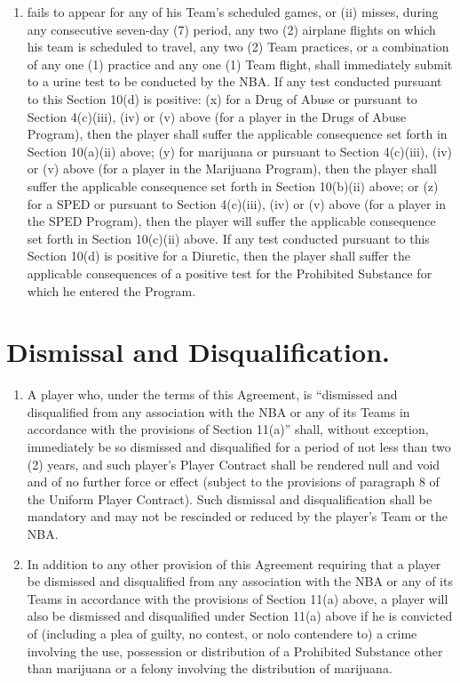 \documentclass[
]{book}
\providecommand{\tightlist}{%
  \setlength{\itemsep}{0pt}\setlength{\parskip}{0pt}}
\begin{document}
\begin{enumerate}
  \begin{enumerate}
  \def\labelenumii{(\roman{enumii})}
  \tightlist
  \item
    fails to appear for any of his Team's scheduled games, or (ii) misses, during any consecutive seven-day (7) period, any two (2) airplane flights on which his team is scheduled to travel, any two (2) Team practices, or a combination of any one (1) practice and any one (1) Team flight, shall immediately submit to a urine test to be conducted by the NBA. If any test conducted pursuant to this Section 10(d) is positive: (x) for a Drug of Abuse or pursuant to Section 4(c)(iii), (iv) or (v) above (for a player in the Drugs of Abuse Program), then the player shall suffer the applicable consequence set forth in Section 10(a)(ii) above; (y) for marijuana or pursuant to Section 4(c)(iii), (iv) or (v) above (for a player in the Marijuana Program), then the player shall suffer the applicable consequence set forth in Section 10(b)(ii) above; or (z) for a SPED or pursuant to Section 4(c)(iii), (iv) or (v) above (for a player in the SPED Program), then the player will suffer the applicable consequence set forth in Section 10(c)(ii) above. If any test conducted pursuant to this Section 10(d) is positive for a Diuretic, then the player shall suffer the applicable consequences of a positive test for the Prohibited Substance for which he entered the Program.
  \end{enumerate}
\end{enumerate}

\hypertarget{dismissal-and-disqualification.}{%
\section{Dismissal and Disqualification.}\label{dismissal-and-disqualification.}}

\begin{enumerate}
\def\labelenumi{(\alph{enumi})}
\tightlist
\item
  A player who, under the terms of this Agreement, is ``dismissed and disqualified from any association with the NBA or any of its Teams in accordance with the provisions of Section 11(a)'' shall, without exception, immediately be so dismissed and disqualified for a period of not less than two (2) years, and such player's Player Contract shall be rendered null and void and of no further force or effect (subject to the provisions of paragraph 8 of the Uniform Player Contract). Such dismissal and disqualification shall be mandatory and may not be rescinded or reduced by the player's Team or the NBA.
\item
  In addition to any other provision of this Agreement requiring that a player be dismissed and disqualified from any association with the NBA or any of its Teams in accordance with the provisions of Section 11(a) above, a player will also be dismissed and disqualified under Section 11(a) above if he is convicted of (including a plea of guilty, no contest, or nolo contendere to) a crime involving the use, possession or distribution of a Prohibited Substance other than marijuana or a felony involving the distribution of marijuana.
\end{enumerate}
\end{document}
